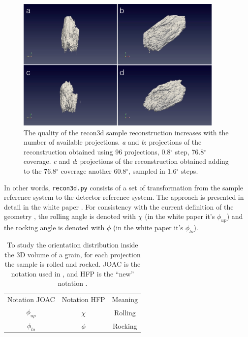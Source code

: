 \documentclass[11pt]{scrartcl}
\begin{document}
\begin{figure}[h]
    \centering
    \includegraphics[width=0.9\textwidth]{recon3d_different_ranges.png}
    \caption{The quality of the recon3d sample reconstruction increases with the number of available projections. {\emph{a}} and {\emph{b}}: projections of the reconstruction obtained using 96 projections, 0.8$^{\circ}$ step, 76.8$^{\circ}$ coverage. {\emph{c}} and {\emph{d}}: projections of the reconstruction obtained adding to the 76.8$^{\circ}$ coverage another 60.8$^{\circ}$, sampled in 1.6$^{\circ}$ steps.}
    \label{fig:recon3d_different_ranges}
\end{figure}

In other words, {\texttt{recon3d.py}} consists of a set of transformation from the sample reference system to the detector reference system. The approach is presented in detail in the white paper \cite{report_jette_anders}. For consistency with the current definition of the geometry \cite{henning_joac}, the rolling angle is denoted with $\chi$ (in the white paper it's $\phi_{up}$) and the rocking angle is denoted with $\phi$ (in the white paper it's $\phi_{lo}$).

\begin{table}[h]
    \begin{center}
    \begin{tabular}{ c c c }
        Notation {\footnotesize{JOAC}} & Notation {\footnotesize{HFP}} & Meaning \\
        $\phi_{up}$ & $\chi$ & Rolling \\
        $\phi_{lo}$ & $\phi$ & Rocking \\
    \end{tabular}
    \end{center}
    \caption{To study the orientation distribution inside the {\footnotesize{3D}} volume of a grain, for each projection the sample is rolled and rocked. {\footnotesize{JOAC}} is the notation used in \cite{report_jette_anders}, and {\footnotesize{HFP}} is the ``new'' notation \cite{henning_joac}.}
    \label{tab:angles}
\end{table}
\end{document}
